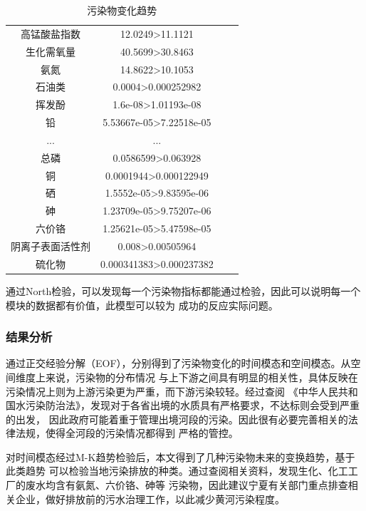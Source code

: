 \documentclass{whutmod}
\begin{document}
\begin{spacing}{1.2}
\begin{table}[H]
	\centering
	\caption{污染物变化趋势}\small
	\begin{tabular}{cccc}\toprule[1.5pt]
		\makebox[0.3\textwidth][c]{污染物种类} & \makebox[0.4\textwidth][c]{North检验结果} \\ \hline
		高锰酸盐指数 & 12.0249>11.1121 \\
		生化需氧量 & 40.5699>30.8463 \\
		氨氮  & 14.8622>10.1053 \\
		石油类 & 0.0004>0.000252982 \\
		挥发酚 & 1.6e-08>1.01193e-08 \\
		铅   & 5.53667e-05>7.22518e-05 \\
		... & ... \\
		总磷  & 0.0586599>0.063928 \\
		铜   & 0.0001944>0.000122949 \\
		硒   & 1.5552e-05>9.83595e-06 \\
		砷   & 1.23709e-05>9.75207e-06 \\
		六价铬 & 1.25621e-05>5.47598e-05 \\
		阴离子表面活性剂 & 0.008>0.00505964 \\
		硫化物 & 0.000341383>0.000237382 \\
		\bottomrule[1.5pt]	
	 \end{tabular}%
	\label{趋势}%
\end{table}%

通过North检验，可以发现每一个污染物指标都能通过检验，因此可以说明每一个模块的数据都有价值，此模型可以较为
成功的反应实际问题。

\subsubsection{结果分析}

通过正交经验分解（EOF），分别得到了污染物变化的时间模态和空间模态。从空间维度上来说，污染物的分布情况
与上下游之间具有明显的相关性，具体反映在污染情况上则为上游污染更为严重，而下游污染较轻。经过查阅
《中华人民共和国水污染防治法》，发现对于各省出境的水质具有严格要求，不达标则会受到严重的出发，
因此政府可能着重于管理出境河段的污染。因此很有必要完善相关的法律法规，使得全河段的污染情况都得到
严格的管控。

对时间模态经过M-K趋势检验后，本文得到了几种污染物未来的变换趋势，基于此类趋势
可以检验当地污染排放的种类。通过查阅相关资料，发现生化、化工工厂的废水均含有氨氮、六价铬、砷等
污染物，因此建议宁夏有关部门重点排查相关企业，做好排放前的污水治理工作，以此减少黄河污染程度。





\end{spacing}
\end{document}

